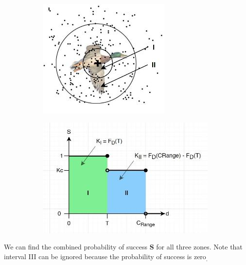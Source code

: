 \documentclass[11pt]{book}
\begin{document}
\begin{figure}[H]
\centering
\begin{subfigure}[b]{0.45\textwidth}
\centering
\includegraphics[width=\textwidth]{./images/image3.jpeg}
\end{subfigure}
\hfill
\begin{subfigure}[b]{0.45\textwidth}
\centering
\includegraphics[width=\textwidth]{./images/image4.jpeg}
\end{subfigure}
\end{figure}


We can find the combined probability of success \textbf{S }for all three zones. Note that interval III can be ignored because the probability of success is zero\textsubscript{. }
\end{document}
